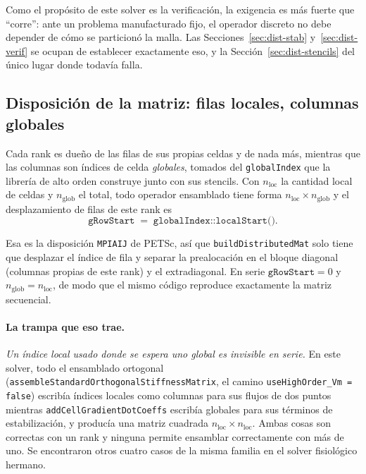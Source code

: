 \documentclass[11pt,a4paper]{article}
\newcommand{\code}[1]{\texttt{\small #1}}
\begin{document}
Como el propósito de este solver es la verificación, la exigencia es más fuerte
que ``corre'': ante un problema manufacturado fijo, el operador discreto no debe
depender de cómo se particionó la malla. Las Secciones~\ref{sec:dist-stab}
y~\ref{sec:dist-verif} se ocupan de establecer exactamente eso, y la
Sección~\ref{sec:dist-stencils} del único lugar donde todavía falla.

\subsection{Disposición de la matriz: filas locales, columnas globales}
\label{sec:dist-layout}

Cada rank es dueño de las filas de sus propias celdas y de nada más, mientras
que las columnas son índices de celda \emph{globales}, tomados del
\code{globalIndex} que la librería de alto orden construye junto con sus
stencils. Con $n_{\text{loc}}$ la cantidad local de celdas y $n_{\text{glob}}$
el total, todo operador ensamblado tiene forma
$n_{\text{loc}}\times n_{\text{glob}}$ y el desplazamiento de filas de este rank
es
\[
   \texttt{gRowStart} \;=\; \texttt{globalIndex::localStart()} .
\]

Esa es la disposición \code{MPIAIJ} de PETSc, así que
\code{buildDistributedMat} solo tiene que desplazar el índice de fila y separar
la prealocación en el bloque diagonal (columnas propias de este rank) y el
extradiagonal. En serie $\texttt{gRowStart}=0$ y
$n_{\text{glob}}=n_{\text{loc}}$, de modo que el mismo código reproduce
exactamente la matriz secuencial.

\paragraph{La trampa que eso trae.} \emph{Un índice local usado donde se espera
uno global es invisible en serie.} En este solver, todo el ensamblado ortogonal
(\code{assembleStandardOrthogonalStiffnessMatrix}, el camino
\code{useHighOrder\_Vm = false}) escribía índices locales como columnas para sus
flujos de dos puntos mientras \code{addCellGradientDotCoeffs} escribía globales
para sus términos de estabilización, y producía una matriz cuadrada
$n_{\text{loc}}\times n_{\text{loc}}$. Ambas cosas son correctas con un rank y
ninguna permite ensamblar correctamente con más de uno. Se encontraron otros
cuatro casos de la misma familia en el solver fisiológico hermano.
\end{document}
